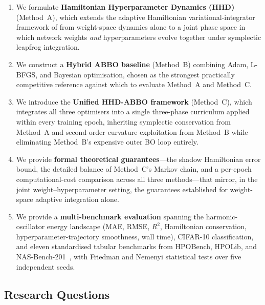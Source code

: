 \documentclass[11pt]{article}
\theoremstyle{definition}
\begin{document}
\begin{enumerate}[leftmargin=*, label=\textbf{C\arabic*.}]
\item We formulate \textbf{Hamiltonian Hyperparameter Dynamics (HHD)}
      (Method~A), which extends the adaptive Hamiltonian
      variational-integrator framework of
      \cite{duruisseaux2021adaptive} from weight-space dynamics alone
      to a joint phase space in which network weights \emph{and}
      hyperparameters evolve together under symplectic leapfrog
      integration.

\item We construct a \textbf{Hybrid ABBO baseline} (Method~B)
      combining Adam, L-BFGS, and Bayesian optimisation, chosen as
      the strongest practically competitive reference against which
      to evaluate Method~A and Method~C.

\item We introduce the \textbf{Unified HHD-ABBO framework}
      (Method~C), which integrates all three optimisers into a
      single three-phase curriculum applied within every training
      epoch, inheriting symplectic conservation from Method~A and
      second-order curvature exploitation from Method~B while
      eliminating Method~B's expensive outer BO loop entirely.

\item We provide \textbf{formal theoretical guarantees}---the shadow
      Hamiltonian error bound, the detailed balance of Method~C's
      Markov chain, and a per-epoch computational-cost comparison
      across all three methods---that mirror, in the joint
      weight--hyperparameter setting, the guarantees
      \cite{duruisseaux2021adaptive} established for weight-space
      adaptive integration alone.

\item We provide a \textbf{multi-benchmark evaluation} spanning the
      harmonic-oscillator energy landscape (MAE, RMSE, $R^2$,
      Hamiltonian conservation, hyperparameter-trajectory smoothness,
      wall time), CIFAR-10 classification, and eleven standardised
      tabular benchmarks from HPOBench, HPOLib, and
      NAS-Bench-201~\cite{eggensperger2021,dong2020nasbench201}, with
      Friedman and Nemenyi statistical tests over five independent
      seeds.
\end{enumerate}

\subsection{Research Questions}
\end{document}
